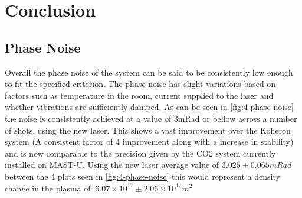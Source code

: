 \documentclass[12pt,a4paper,oneside]{report}
\begin{document}
\chapter{Conclusion}
\section{Phase Noise}
Overall the phase noise of the system can be said to be consistently low enough to fit the specified criterion. The phase noise has slight variations based on factors such as temperature in the room, current supplied to the laser and whether vibrations are sufficiently damped. As can be seen in \autoref{fig:4-phase-noise} the noise is consistently achieved at a value of 3mRad or bellow across a number of shots, using the new laser. This shows a vast improvement over the Koheron system (A consistent factor of 4 improvement along with a increase in stability) and is now comparable to the precision given by the CO2 system currently installed on MAST-U. Using the new laser average value of $3.025 \pm 0.065 mRad$ between the 4 plots seen in \autoref{fig:4-phase-noise} this would represent a density change in the plasma of $~ 6.07\times 10^{17} \pm 2.06\times 10^{17} m^{2}$
\end{document}
